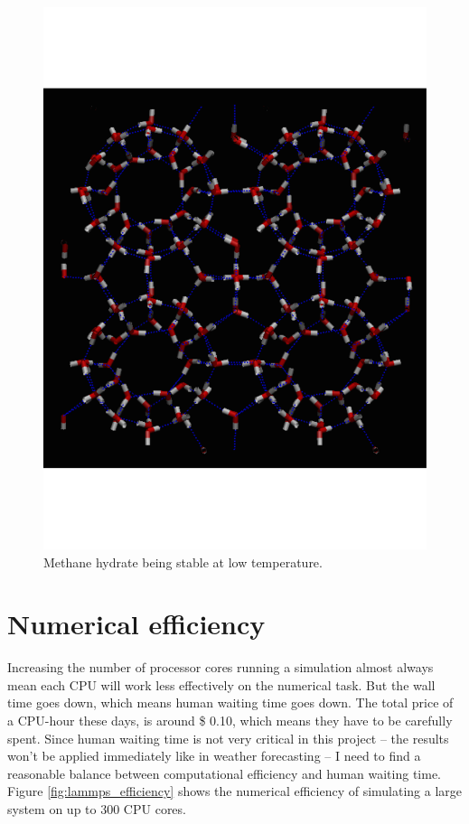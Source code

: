 \begin{figure}
\includegraphics[width=\textwidth]{../snapshots/first_stable_hydrate.pdf}
\caption{Methane hydrate being stable at low temperature.}
\label{fig:part2:first_hydrate}
\end{figure}

\section{Numerical efficiency}
Increasing the number of processor cores running a simulation almost always mean each CPU will work less effectively on the numerical task. But the wall time goes down, which means human waiting time goes down. The total price of a CPU-hour these days, is around \$ 0.10, which means they have to be carefully spent. Since human waiting time is not very critical in this project -- the results won't be applied immediately like in weather forecasting -- I need to find a reasonable balance between computational efficiency and human waiting time. Figure \ref{fig:lammps_efficiency} shows the numerical efficiency of simulating a large system on up to 300 CPU cores.

